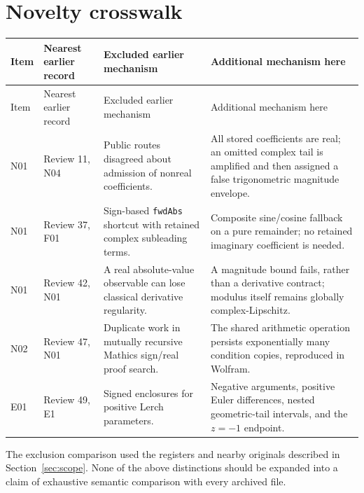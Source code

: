 \documentclass[11pt,a4paper]{article}
\begin{document}
\section{Novelty crosswalk}
\label{sec:novelty}
\begin{longtable}{@{}P{13mm}P{39mm}P{45mm}P{50mm}@{}}
\toprule
Item & Nearest earlier record & Excluded earlier mechanism & Additional mechanism here\\
\midrule
\endfirsthead
\toprule Item & Nearest earlier record & Excluded earlier mechanism & Additional mechanism here\\\midrule
\endhead
N01 & Review 11, N04\cite{r11} & Public routes disagreed about admission of nonreal coefficients. & All stored coefficients are real; an omitted complex tail is amplified and then assigned a false trigonometric magnitude envelope.\\[5pt]
N01 & Review 37, F01\cite{r37} & Sign-based \texttt{fwdAbs} shortcut with retained complex subleading terms. & Composite sine/cosine fallback on a pure remainder; no retained imaginary coefficient is needed.\\[5pt]
N01 & Review 42, N01\cite{r42} & A real absolute-value observable can lose classical derivative regularity. & A magnitude bound fails, rather than a derivative contract; modulus itself remains globally complex-Lipschitz.\\[5pt]
N02 & Review 47, N01\cite{r47} & Duplicate work in mutually recursive Mathics sign/real proof search. & The shared arithmetic operation persists exponentially many condition copies, reproduced in Wolfram.\\[5pt]
E01 & Review 49, E1\cite{r49} & Signed enclosures for positive Lerch parameters. & Negative arguments, positive Euler differences, nested geometric-tail intervals, and the $z=-1$ endpoint.\\
\bottomrule
\end{longtable}
The exclusion comparison used the registers and nearby originals described in Section~\ref{sec:scope}. None of the above distinctions should be expanded into a claim of exhaustive semantic comparison with every archived file.
\end{document}
